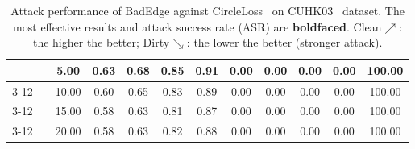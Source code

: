 \begin{table}[htbp]
{\begin{tabular}{cc|c|ccccccccc}
\multicolumn{1}{c|}{} &
   &
  5.00 &
  \multicolumn{1}{c|}{0.63} &
  \multicolumn{1}{c|}{0.68} &
  \multicolumn{1}{c|}{0.85} &
  \multicolumn{1}{c|}{0.91} &
  \multicolumn{1}{c|}{0.00} &
  \multicolumn{1}{c|}{0.00} &
  \multicolumn{1}{c|}{0.00} &
  \multicolumn{1}{c|}{0.00} &
  100.00 \\ \cline{3-12} 
\multicolumn{1}{c|}{} &
   &
  10.00 &
  \multicolumn{1}{c|}{0.60} &
  \multicolumn{1}{c|}{0.65} &
  \multicolumn{1}{c|}{0.83} &
  \multicolumn{1}{c|}{0.89} &
  \multicolumn{1}{c|}{0.00} &
  \multicolumn{1}{c|}{0.00} &
  \multicolumn{1}{c|}{0.00} &
  \multicolumn{1}{c|}{0.00} &
  100.00 \\ \cline{3-12} 
\multicolumn{1}{c|}{} &
   &
  15.00 &
  \multicolumn{1}{c|}{0.58} &
  \multicolumn{1}{c|}{0.63} &
  \multicolumn{1}{c|}{0.81} &
  \multicolumn{1}{c|}{0.87} &
  \multicolumn{1}{c|}{0.00} &
  \multicolumn{1}{c|}{0.00} &
  \multicolumn{1}{c|}{0.00} &
  \multicolumn{1}{c|}{0.00} &
  100.00 \\ \cline{3-12} 
\multicolumn{1}{c|}{} &
   &
  20.00 &
  \multicolumn{1}{c|}{0.58} &
  \multicolumn{1}{c|}{0.63} &
  \multicolumn{1}{c|}{0.82} &
  \multicolumn{1}{c|}{0.88} &
  \multicolumn{1}{c|}{0.00} &
  \multicolumn{1}{c|}{0.00} &
  \multicolumn{1}{c|}{0.00} &
  \multicolumn{1}{c|}{0.00} &
  100.00 \\ \hline
\end{tabular}
}
\caption{
Attack performance of BadEdge against CircleLoss~\cite{sun2018beyond} on CUHK03~\cite{zhang2017alignedreid}  dataset. The most effective results and attack success rate (ASR) are \textbf{boldfaced}. Clean$\nearrow$: the higher the better; Dirty$\searrow$: the lower the better (stronger attack).}
% 
\label{tab:Circleloss_cuk}
\vspace{-0.6cm}
\end{table}